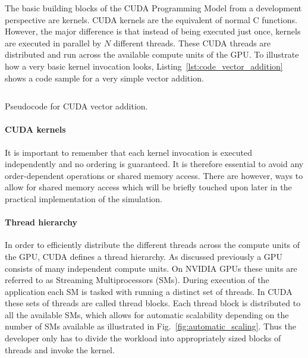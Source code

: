 The basic building blocks of the CUDA Programming Model from a development perspective are kernels. CUDA kernels are the equivalent of normal C functions. However, the major difference is that instead of being executed just once, kernels are executed in parallel by $N$ different threads. These CUDA threads are distributed and run across the available compute units of the GPU. To illustrate how a very basic kernel invocation looks, Listing~\ref{lst:code_vector_addition} shows a code sample for a very simple vector addition.

\begin{listing}[!htbp]
  \centering
  \inputminted[mathescape,
    linenos,
    numbersep=5pt,
    fontsize=\footnotesize,
    frame=lines,
    framesep=2mm]{c}{lst/cuda_vector_add.lst}
  \caption{Pseudocode for CUDA vector addition.}
  \label{lst:code_vector_addition}
\end{listing}

\paragraph{CUDA kernels}

It is important to remember that each kernel invocation is executed independently and no ordering is guaranteed. It is therefore essential to avoid any order-dependent operations or shared memory access. There are however, ways to allow for shared memory access which will be briefly touched upon later in the practical implementation of the simulation.

\paragraph{Thread hierarchy}

In order to efficiently distribute the different threads across the compute units of the GPU, CUDA defines a thread hierarchy. As discussed previously a GPU consists of many independent compute units. On NVIDIA GPUs these units are referred to as Streaming Multiprocessors (SMs). During execution of the application each SM is tasked with running a distinct set of threads. In CUDA these sets of threads are called thread blocks. Each thread block is distributed to all the available SMs, which allows for automatic scalability depending on the number of SMs available  as illustrated in Fig.~\ref{fig:automatic_scaling}. Thus the developer only has to divide the workload into appropriately sized blocks of threads and invoke the kernel.

